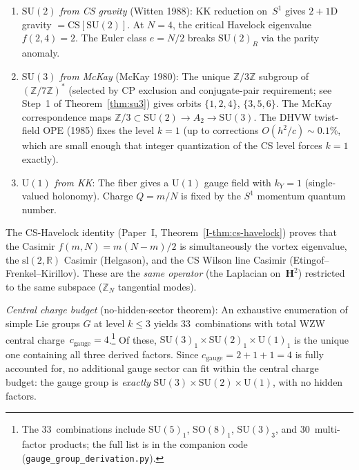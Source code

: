 \begin{enumerate}
\item \emph{$\mathrm{SU}(2)$ from CS gravity} (Witten 1988):
  KK reduction on~$S^1$ gives $2{+}1$D gravity $= \mathrm{CS}[\mathrm{SU}(2)]$.
  At $N = 4$, the critical Havelock eigenvalue $f(2,4) = 2$.
  The Euler class $e = N/2$ breaks
  $\mathrm{SU}(2)_R$ via the parity anomaly.

\item \emph{$\mathrm{SU}(3)$ from McKay} (McKay 1980):
  The unique $\mathbb{Z}/3\mathbb{Z}$ subgroup of
  $(\mathbb{Z}/7\mathbb{Z})^*$ (selected by CP exclusion
  and conjugate-pair requirement; see Step~1 of
  Theorem~\ref{thm:su3}) gives orbits
  $\{1,2,4\}$, $\{3,5,6\}$.
  The McKay correspondence maps
  $\mathbb{Z}/3 \subset \mathrm{SU}(2) \to A_2 \to \mathrm{SU}(3)$.
  The DHVW twist-field OPE (1985) fixes the level
  $k = 1$ (up to corrections $O(h^2/c) \sim 0.1\%$,
  which are small enough that integer quantization
  of the CS level forces $k = 1$ exactly).

\item \emph{$\mathrm{U}(1)$ from KK}:
  The fiber gives a $\mathrm{U}(1)$ gauge field with
  $k_Y = 1$ (single-valued holonomy).
  Charge $Q = m/N$ is fixed by the $S^1$ momentum quantum number.
\end{enumerate}

The CS-Havelock identity (Paper~I, Theorem~\ref*{I-thm:cs-havelock})
proves that the Casimir $f(m,N) = m(N{-}m)/2$ is simultaneously
the vortex eigenvalue, the $\mathrm{sl}(2,\mathbb{R})$ Casimir
(Helgason), and the CS Wilson line Casimir (Etingof--Frenkel--Kirillov).
These are the \emph{same operator} (the Laplacian on~$\mathbf{H}^2$)
restricted to the same subspace ($\mathbb{Z}_N$ tangential modes).

\emph{Central charge budget} (no-hidden-sector theorem):
An exhaustive enumeration of simple Lie groups $G$ at level
$k \le 3$ yields $33$~combinations with total WZW central
charge~$c_{\mathrm{gauge}} = 4$.\footnote{The $33$~combinations
include $\mathrm{SU}(5)_1$, $\mathrm{SO}(8)_1$,
$\mathrm{SU}(3)_3$, and $30$~multi-factor products;
the full list is in the companion code
(\texttt{gauge\_group\_derivation.py}).}
Of these, $\mathrm{SU}(3)_1 \times \mathrm{SU}(2)_1 \times \mathrm{U}(1)_1$
is the unique one containing all three derived factors.
Since $c_{\mathrm{gauge}} = 2 + 1 + 1 = 4$ is fully accounted for,
no additional gauge sector can fit within the central charge budget:
the gauge group is \emph{exactly}
$\mathrm{SU}(3) \times \mathrm{SU}(2) \times \mathrm{U}(1)$,
with no hidden factors.

